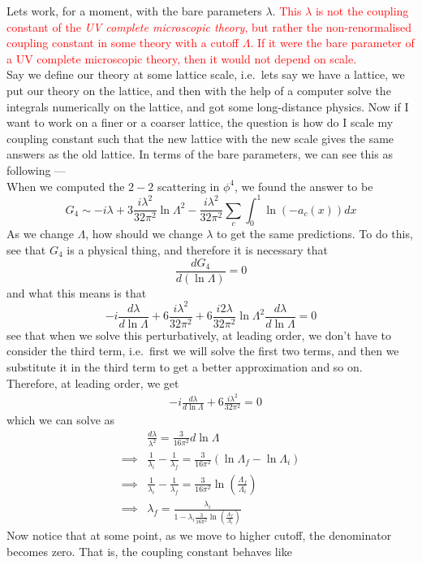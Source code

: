 \documentclass[11pt]{article}
\numberwithin{equation}{section}
\begin{document}
Lets work, for a moment, with the bare parameters \(\lambda\). \textcolor{red}{This \(\lambda\) is not the coupling constant of the \textit{UV complete microscopic theory}, but rather the non-renormalised coupling constant in some theory with a cutoff \(\Lambda\). If it were the bare parameter of a UV complete microscopic theory, then it would not depend on scale.}  \\
Say we define our theory at some lattice scale, i.e.\ lets say we have a lattice, we put our theory on the lattice, and then with the help of a computer solve the integrals numerically on the lattice, and got some long-distance physics. Now if I want to work on a finer or a coarser lattice, the question is how do I scale my coupling constant such that the new lattice with the new scale gives the same answers as the old lattice. In terms of the bare parameters, we can see this as following — \\
When we computed the \(2-2\) scattering in \(\phi^4\), we found the answer to be 
\begin{equation*}
    G_4 \sim -i\lambda + 3\frac{i\lambda^2}{32\pi^2}\ln\Lambda^2 - \frac{i\lambda^2}{32\pi^2}\sum_c \int_0^1 \ln(-a_c(x))dx 
\end{equation*}
As we change \(\Lambda\), how should we change \(\lambda\) to get the same predictions. To do this, see that \(G_4\) is a physical thing, and therefore it is necessary that 
\begin{equation*}
    \frac{dG_4}{d(\ln\Lambda)} = 0
\end{equation*}
and what this means is that 
\begin{equation*}
    -i\frac{d\lambda}{d\ln\Lambda} + 6\frac{i\lambda^2}{32\pi^2} +6\frac{i2\lambda}{32\pi^2}\ln\Lambda^2 \frac{d\lambda}{d\ln\Lambda}  = 0
\end{equation*}
see that when we solve this perturbatively, at leading order, we don't have to consider the third term, i.e.\ first we will solve the first two terms, and then we substitute it in the third term to get a better approximation and so on. Therefore, at leading order, we get 
\begin{align*}
    &-i\frac{d\lambda}{d\ln\Lambda} + 6\frac{i\lambda^2}{32\pi^2} = 0 
\end{align*}
which we can solve as 
\begin{align*}
    & \frac{d\lambda}{\lambda^2} = \frac{3}{16\pi^2}d\ln\Lambda\\
    \implies & \frac{1}{\lambda_i}-\frac{1}{\lambda_f} = \frac{3}{16\pi^2}\left(  \ln \Lambda_f - \ln \Lambda_i  \right)\\
    \implies & \frac{1}{\lambda_i}-\frac{1}{\lambda_f} = \frac{3}{16\pi^2}  \ln \left( \frac{\Lambda_f}{\Lambda_i} \right)\\
    \implies & \lambda_f = \frac{\lambda_i}{1 - \lambda_i\displaystyle\frac{3}{16\pi^2}  \ln \left( \frac{\Lambda_f}{\Lambda_i} \right)}
\end{align*}
Now notice that at some point, as we move to higher cutoff, the denominator becomes zero. That is, the coupling constant behaves like 
\end{document}
